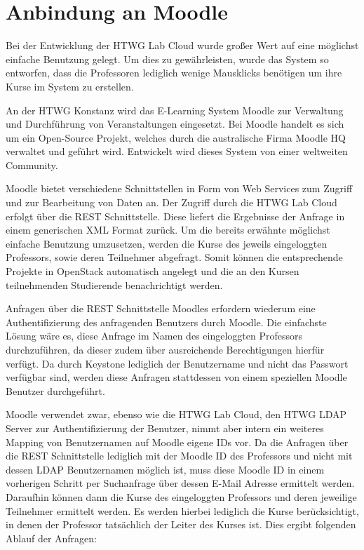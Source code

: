 \section{Anbindung an Moodle}
Bei der Entwicklung der HTWG Lab Cloud wurde großer Wert auf eine möglichst einfache Benutzung gelegt. Um dies zu gewährleisten, wurde das System so entworfen, dass die Professoren lediglich wenige Mausklicks benötigen um ihre Kurse im System zu erstellen.

An der HTWG Konstanz wird das E-Learning System Moodle zur Verwaltung und Durchführung von Veranstaltungen eingesetzt. Bei Moodle handelt es sich um ein Open-Source Projekt, welches durch die australische Firma Moodle HQ verwaltet und geführt wird. Entwickelt wird dieses System von einer weltweiten Community.

Moodle bietet verschiedene Schnittstellen in Form von Web Services zum Zugriff und zur Bearbeitung von Daten an. Der Zugriff durch die HTWG Lab Cloud erfolgt über die REST Schnittstelle. Diese liefert die Ergebnisse der Anfrage in einem generischen XML Format zurück.
Um die bereits erwähnte möglichst einfache Benutzung umzusetzen, werden die Kurse des jeweils eingeloggten Professors, sowie deren Teilnehmer abgefragt. Somit können die entsprechende Projekte in OpenStack automatisch angelegt und die an den Kursen teilnehmenden Studierende benachrichtigt werden.

Anfragen über die REST Schnittstelle Moodles erfordern wiederum eine Authentifizierung des anfragenden Benutzers durch Moodle. Die einfachste Lösung wäre es, diese Anfrage im Namen des eingeloggten Professors durchzuführen, da dieser zudem über ausreichende Berechtigungen hierfür verfügt. Da durch Keystone lediglich der Benutzername und nicht das Passwort verfügbar sind, werden diese Anfragen stattdessen von einem speziellen Moodle Benutzer durchgeführt.

Moodle verwendet zwar, ebenso wie die HTWG Lab Cloud, den HTWG LDAP Server zur Authentifizierung der Benutzer, nimmt aber intern ein weiteres Mapping von Benutzernamen auf Moodle eigene IDs vor. Da die Anfragen über die REST Schnittstelle lediglich mit der Moodle ID des Professors und nicht mit dessen LDAP Benutzernamen möglich ist, muss diese Moodle ID in einem vorherigen Schritt per Suchanfrage über dessen E-Mail Adresse ermittelt werden. Daraufhin können dann die Kurse des eingeloggten Professors und deren jeweilige Teilnehmer ermittelt werden. Es werden hierbei lediglich die Kurse berücksichtigt, in denen der Professor tatsächlich der Leiter des Kurses ist. Dies ergibt folgenden Ablauf der Anfragen:

